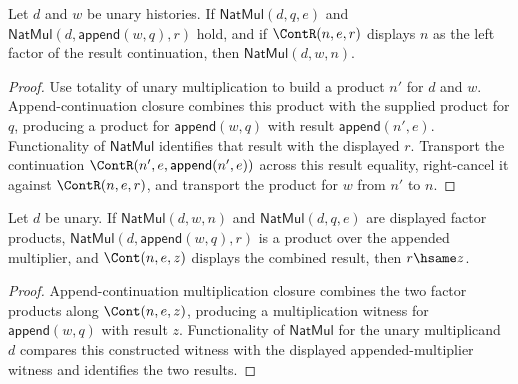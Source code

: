 \begin{lemma}
\label{lem:nat-mul-append-multiplier-left-factor}
Let $d$ and $w$ be unary histories. If $\mathsf{NatMul}(d,q,e)$ and
$\mathsf{NatMul}(d,\mathsf{append}(w,q),r)$ hold, and if $\ContR(n,e,r)$
displays $n$ as the left factor of the result continuation, then
$\mathsf{NatMul}(d,w,n)$.
\end{lemma}
\begin{proof}
Use totality of unary multiplication to build a product $n'$ for $d$ and $w$.
Append-continuation closure combines this product with the supplied product for
$q$, producing a product for $\mathsf{append}(w,q)$ with result
$\mathsf{append}(n',e)$. Functionality of $\mathsf{NatMul}$ identifies that
result with the displayed $r$. Transport the continuation
$\ContR(n',e,\mathsf{append}(n',e))$ across this result equality, right-cancel
it against $\ContR(n,e,r)$, and transport the product for $w$ from $n'$ to $n$.
\end{proof}

\begin{theorem}
\label{thm:natmul-append-multiplier-result-deterministic}
Let $d$ be unary. If $\mathsf{NatMul}(d,w,n)$ and $\mathsf{NatMul}(d,q,e)$
are displayed factor products, $\mathsf{NatMul}(d,\mathsf{append}(w,q),r)$ is
a product over the appended multiplier, and $\Cont(n,e,z)$ displays the
combined result, then $r\hsame z$.
\end{theorem}
\begin{proof}
Append-continuation multiplication closure combines the two factor products
along $\Cont(n,e,z)$, producing a multiplication witness for
$\mathsf{append}(w,q)$ with result $z$. Functionality of
$\mathsf{NatMul}$ for the unary multiplicand $d$ compares this constructed
witness with the displayed appended-multiplier witness and identifies the two
results.
\end{proof}

